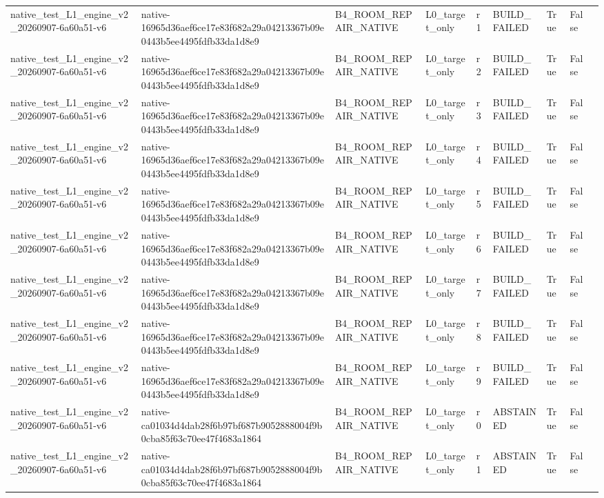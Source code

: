 \begin{tabular}{lllllllll}
native\_test\_L1\_engine\_v2\_20260907-6a60a51-v6 & native-16965d36aef6ce17e83f682a29a04213367b09e0443b5ee4495fdfb33da1d8e9 & B4\_ROOM\_REPAIR\_NATIVE & L0\_target\_only & r1 & BUILD\_FAILED & True & False &  \\
native\_test\_L1\_engine\_v2\_20260907-6a60a51-v6 & native-16965d36aef6ce17e83f682a29a04213367b09e0443b5ee4495fdfb33da1d8e9 & B4\_ROOM\_REPAIR\_NATIVE & L0\_target\_only & r2 & BUILD\_FAILED & True & False &  \\
native\_test\_L1\_engine\_v2\_20260907-6a60a51-v6 & native-16965d36aef6ce17e83f682a29a04213367b09e0443b5ee4495fdfb33da1d8e9 & B4\_ROOM\_REPAIR\_NATIVE & L0\_target\_only & r3 & BUILD\_FAILED & True & False &  \\
native\_test\_L1\_engine\_v2\_20260907-6a60a51-v6 & native-16965d36aef6ce17e83f682a29a04213367b09e0443b5ee4495fdfb33da1d8e9 & B4\_ROOM\_REPAIR\_NATIVE & L0\_target\_only & r4 & BUILD\_FAILED & True & False &  \\
native\_test\_L1\_engine\_v2\_20260907-6a60a51-v6 & native-16965d36aef6ce17e83f682a29a04213367b09e0443b5ee4495fdfb33da1d8e9 & B4\_ROOM\_REPAIR\_NATIVE & L0\_target\_only & r5 & BUILD\_FAILED & True & False &  \\
native\_test\_L1\_engine\_v2\_20260907-6a60a51-v6 & native-16965d36aef6ce17e83f682a29a04213367b09e0443b5ee4495fdfb33da1d8e9 & B4\_ROOM\_REPAIR\_NATIVE & L0\_target\_only & r6 & BUILD\_FAILED & True & False &  \\
native\_test\_L1\_engine\_v2\_20260907-6a60a51-v6 & native-16965d36aef6ce17e83f682a29a04213367b09e0443b5ee4495fdfb33da1d8e9 & B4\_ROOM\_REPAIR\_NATIVE & L0\_target\_only & r7 & BUILD\_FAILED & True & False &  \\
native\_test\_L1\_engine\_v2\_20260907-6a60a51-v6 & native-16965d36aef6ce17e83f682a29a04213367b09e0443b5ee4495fdfb33da1d8e9 & B4\_ROOM\_REPAIR\_NATIVE & L0\_target\_only & r8 & BUILD\_FAILED & True & False &  \\
native\_test\_L1\_engine\_v2\_20260907-6a60a51-v6 & native-16965d36aef6ce17e83f682a29a04213367b09e0443b5ee4495fdfb33da1d8e9 & B4\_ROOM\_REPAIR\_NATIVE & L0\_target\_only & r9 & BUILD\_FAILED & True & False &  \\
native\_test\_L1\_engine\_v2\_20260907-6a60a51-v6 & native-ca01034d4dab28f6b97bf687b9052888004f9b0cba85f63c70ee47f4683a1864 & B4\_ROOM\_REPAIR\_NATIVE & L0\_target\_only & r0 & ABSTAINED & True & False &  \\
native\_test\_L1\_engine\_v2\_20260907-6a60a51-v6 & native-ca01034d4dab28f6b97bf687b9052888004f9b0cba85f63c70ee47f4683a1864 & B4\_ROOM\_REPAIR\_NATIVE & L0\_target\_only & r1 & ABSTAINED & True & False &  \\

\end{tabular}
